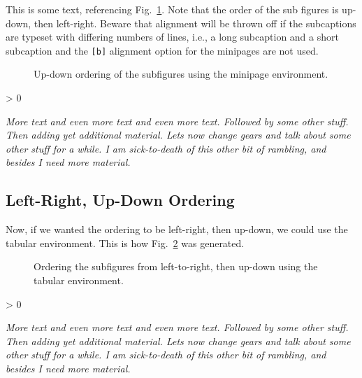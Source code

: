 \documentclass{aiaa}%
\makeatletter
\newlength{\subfigwidth}%
\newlength{\subfigcolsep}%
\newcounter{numrepeat}
\newcommand{\replicate}[2]{\par
 \setcounter{numrepeat}{#1}\relax
 \@whilenum \value{numrepeat} > 0 \do
  {{#2}\addtocounter{numrepeat}{-1}}\par}
\newcommand{\filler}%
  {\em More text and even more text and even more text.
   Followed by some other stuff.
   Then adding yet additional material.
   Lets now change gears and talk about some other stuff for a while.
   I am sick-to-death of this other bit of rambling,
   and besides I need more material.}
\makeatother
\begin{document}
This is some text, referencing Fig.~\ref{fig:udlr}. Note that
the order of the sub figures is up-down, then left-right.
Beware that alignment will be thrown off if the subcaptions are
typeset with differing numbers of lines, i.e., a long subcaption
and a short subcaption and the \texttt{[b]} alignment option for the
minipages are not used.
\begin{figure}
  \setlength{\subfigwidth}{.5\linewidth}
  \addtolength{\subfigwidth}{-.5\subfigcolsep}
  \vspace*{-\subfigtopskip}
  \begin{minipage}[b]{\subfigwidth}
  \end{minipage}
  \begin{minipage}[b]{\subfigwidth}
    \setcounter{subfigure}{3}
  \end{minipage}
  \begin{minipage}[b]{\subfigwidth}
    \setcounter{subfigure}{1}
  \end{minipage}
  \begin{minipage}[b]{\subfigwidth}
    \setcounter{subfigure}{4}
  \end{minipage}
  \begin{minipage}[b]{\subfigwidth}
    \setcounter{subfigure}{2}
  \end{minipage}\hfill
  \begin{minipage}[b]{\subfigwidth}
    \setcounter{subfigure}{5}
  \end{minipage}
  \caption{Up-down ordering of the subfigures
           using the minipage environment.}
  \label{fig:udlr}
\end{figure}
\replicate{4}{\filler}

\subsection{Left-Right, Up-Down Ordering}

Now, if we wanted the ordering to be left-right, then
up-down, we could use the tabular environment. This
is how Fig.~\ref{fig:lrud} was generated.
\begin{figure}
  \begin{subfigmatrix}{2}
  \end{subfigmatrix}
  \caption{Ordering the subfigures from left-to-right, then
    up-down using the tabular environment.}
  \label{fig:lrud}
\end{figure}
\replicate{4}{\filler}
\end{document}
